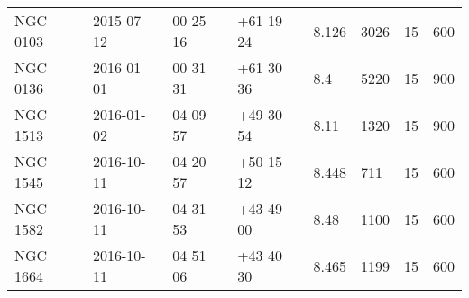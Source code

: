 \documentclass{jaa}
\begin{document}
\begin{table*}
\begin{tabular}{llllllll}
NGC 0103         & 2015-07-12          & 00 25 16      & +61 19 24      & 8.126      & 3026          & 15          & 600           \\
NGC 0136         & 2016-01-01          & 00 31 31      & +61 30 36      & 8.4       & 5220          & 15          & 900           \\
NGC 1513         & 2016-01-02          & 04 09 57      & +49 30 54      & 8.11       & 1320          & 15          & 900           \\
NGC 1545         & 2016-10-11          & 04 20 57      & +50 15 12      & 8.448      & 711           & 15          & 600           \\
NGC 1582         & 2016-10-11          & 04 31 53      & +43 49 00      & 8.48       & 1100          & 15          & 600           \\
NGC 1664         & 2016-10-11          & 04 51 06      & +43 40 30      & 8.465      & 1199          & 15          & 600           \\
\hline
\end{tabular}
\end{table*}
\end{document}
